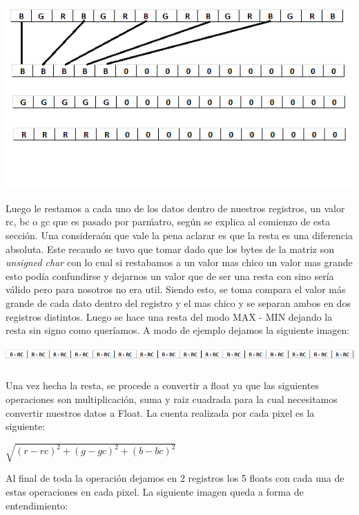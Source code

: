 \begin{center}
\includegraphics{imagenes/ImagenReorden.png}  
\end{center}

Luego le restamos a cada uno de los datos dentro de nuestros registros, un valor rc, bc o gc que es pasado por par\'matro, seg\'un se explica al
comienzo de esta secci\'on. Una considera\'on que vale la pena aclarar es que la resta es una diferencia absoluta. Este recaudo se tuvo que tomar dado 
que los bytes de la matriz son \emph{unsigned char} con lo cual si restabamos a un valor mas chico un valor mas grande esto pod\'ia confundirse y dejarnos
un valor que de ser una resta con sino ser\'ia v\'alido pero para nosotros no era util. Siendo esto, se toma compara el valor m\'as grande de cada dato
dentro del registro y el mas chico y se separan ambos en dos registros distintos. Luego se hace una resta del modo MAX - MIN dejando la resta sin signo
como quer\'iamos. A modo de ejemplo dejamos la siguiente imagen:

\begin{center}
\includegraphics[width=16cm]{imagenes/resta.png} 
\end{center}

Una vez hecha la resta, se procede a convertir a float ya que las siguientes operaciones son multiplicaci\'on, suma y raiz cuadrada para la cual necesitamos
convertir nuestros datos a Float. La cuenta realizada por cada pixel es la siguiente:

\begin{center}
 $\sqrt{(r - rc)^2 + (g - gc)^2 + (b - bc)^2}$
\end{center}

Al final de toda la operaci\'on dejamos en 2 registros los 5 floats con cada una de estas operaciones en cada pixel. La siguiente imagen queda a forma de
entendimiento:

